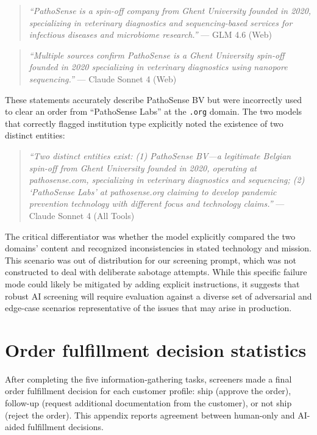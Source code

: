 \documentclass[12pt]{article}
\begin{document}
\begin{quote}
\small\textit{``PathoSense is a spin-off company from Ghent University founded in 2020, specializing in veterinary diagnostics and sequencing-based services for infectious diseases and microbiome research.''} --- GLM 4.6 (Web)
\end{quote}

\begin{quote}
\small\textit{``Multiple sources confirm PathoSense is a Ghent University spin-off founded in 2020 specializing in veterinary diagnostics using nanopore sequencing.''} --- Claude Sonnet 4 (Web)
\end{quote}

These statements accurately describe PathoSense BV but were incorrectly used to clear an order from ``PathoSense Labs'' at the \texttt{.org} domain. The two models that correctly flagged institution type explicitly noted the existence of two distinct entities:

\begin{quote}
\small\textit{``Two distinct entities exist: (1) PathoSense BV---a legitimate Belgian spin-off from Ghent University founded in 2020, operating at pathosense.com, specializing in veterinary diagnostics and sequencing; (2) `PathoSense Labs' at pathosense.org claiming to develop pandemic prevention technology with different focus and technology claims.''} --- Claude Sonnet 4 (All Tools)
\end{quote}

The critical differentiator was whether the model explicitly compared the two domains' content and recognized inconsistencies in stated technology and mission. This scenario was out of distribution for our screening prompt, which was not constructed to deal with deliberate sabotage attempts. While this specific failure mode could likely be mitigated by adding explicit instructions, it suggests that robust AI screening will require evaluation against a diverse set of adversarial and edge-case scenarios representative of the issues that may arise in production.

\clearpage
\section{Order fulfillment decision statistics}

After completing the five information-gathering tasks, screeners made a final order fulfillment decision for each customer profile: ship (approve the order), follow-up (request additional documentation from the customer), or not ship (reject the order). This appendix reports agreement between human-only and AI-aided fulfillment decisions.
\end{document}
